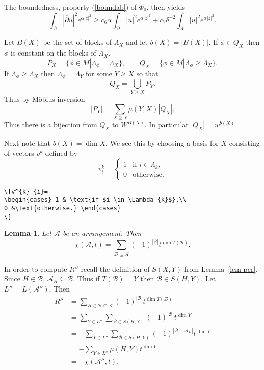\documentclass[draft]{amsart}
\newtheorem{lem}[thm]{Lemma}
\theoremstyle{definition}
\theoremstyle{remark}
\newcommand{\lemref}[1]{Lemma~\ref{#1}}
\newcommand{\A}{\mathcal{A}}
\newcommand{\B}{\mathcal{B}}
\begin{document}
The boundedness, property (\ref{boundab}) of $\Phi_ 0$, then yields
\[\int_{\mathcal{D}}|\overline\partial u|^2e^{\alpha|z|^2}\geq c_6\alpha
\int_{\mathcal{D}}|u|^2e^{\alpha|z|^2}+c_7\delta^{-2}\int_ A|u|^2e^{\alpha|z|^2}.\]

Let $B(X)$ be the set of blocks of $\Lambda_{X}$
and let $b(X) = |B(X)|$. If $\phi \in Q_{X}$ then
$\phi$ is constant on the blocks of $\Lambda_{X}$.
\begin{equation}\label{far-d}
 P_{X} = \{ \phi \in M | \Lambda_{\phi} = \Lambda_{X} \},
\qquad
Q_{X} = \{\phi \in M | \Lambda_{\phi} \geq \Lambda_{X} \}.
\end{equation}
If $\Lambda_{\phi} \geq \Lambda_{X}$ then
$\Lambda_{\phi} = \Lambda_{Y}$ for some $Y \geq X$ so that
\[ Q_{X} = \bigcup_{Y \geq X} P_{Y}. \]
Thus by M\"obius inversion
\[ |P_{Y}|= \sum_{X\geq Y} \mu (Y,X)|Q_{X}|.\]
Thus there is a bijection from $Q_{X}$ to $W^{B(X)}$.
In particular $|Q_{X}| = w^{b(X)}$.

Next note that $b(X)=\dim X$. We see this by choosing a
basis for $X$ consisting of vectors $v^{k}$ defined by
\[v^{k}_{i}=
\begin{cases} 1 & \text{if $i \in \Lambda_{k}$},\\
0 &\text{otherwise.} \end{cases}
\]
\begin{verbatim}
\[v^{k}_{i}=
\begin{cases} 1 & \text{if $i \in \Lambda_{k}$},\\
0 &\text{otherwise.} \end{cases}
\]
\end{verbatim}

\begin{lem}\label{p0201}
Let $\A$ be an arrangement. Then
\[ \chi (\A,t) = \sum_{\B \subseteq \A}
(-1)^{|\B|} t^{\dim T(\B)}. \]
\end{lem}

In order to compute $R''$ recall the definition
of $S(X,Y)$ from \lemref{lem-per}. Since $H \in \B$,
$\A_{H} \subseteq \B$. Thus if $T(\B) = Y$ then
$\B \in S(H,Y)$. Let $L'' = L(\A'')$. Then
\begin{equation}\label{E_SXgYy}
\begin{split}
R''&= \sum_{H\in \B \subseteq \A} (-1)^{|\B|}
t^{\dim T(\B)}\\
&= \sum_{Y \in L''} \sum_{\B \in S(H,Y)}
(-1)^{|\B|}t^{\dim Y} \\
&= -\sum_{Y \in L''} \sum_{\B \in S(H,Y)} (-1)^
{|\B - \A_{H}|} t^{\dim Y} \\
&= -\sum_{Y \in L''} \mu (H,Y)t^{\dim Y} \\
&= -\chi (\A '',t).
\end{split}
\end{equation}
\end{document}

